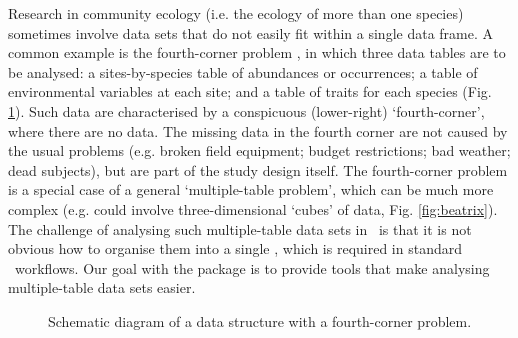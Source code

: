 \documentclass[a4paper]{report}
\numberwithin{exercise}{section}
\begin{document}
\begin{article}
Research in community ecology (i.e. the ecology of more than one species) sometimes involve data sets that do not easily fit within a single data frame.  A common example is the fourth-corner problem \citep{LegendreEtAl1997}, in which three data tables are to be analysed: a sites-by-species table of abundances or occurrences; a table of environmental variables at each site; and a table of traits for each species (Fig. \ref{fig:fourth}).  Such data are characterised by a conspicuous (lower-right) `fourth-corner', where there are no data.  The missing data in the fourth corner are not caused by the usual problems (e.g. broken field equipment; budget restrictions; bad weather; dead subjects), but are part of the study design itself.  The fourth-corner problem is a special case of a general `multiple-table problem', which can be much more complex (e.g. could involve three-dimensional `cubes' of data, Fig. \ref{fig:beatrix}).  The challenge of analysing such multiple-table data sets in \R\ is that it is not obvious how to organise them into a single , which is required in standard \R\ workflows.  Our goal with the  package is to provide tools that make analysing multiple-table data sets easier.

\begin{figure}
\vspace{0.5cm}
\vspace{-1.5cm}
\caption{Schematic diagram of a data structure with a fourth-corner problem.} 
\label{fig:fourth}
\end{figure}


\end{article}
\end{document}
